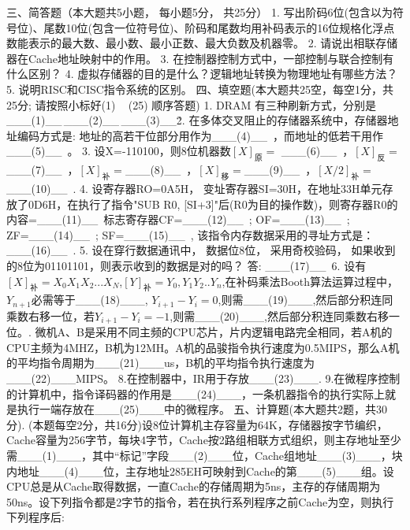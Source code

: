 三、简答题（本大题共5小题， 每小题5分， 共25分）
1. 写出阶码6位(包含以为符号位)、尾数10位(包含一位符号位)、阶码和尾数均用补码表示的16位规格化浮点数能表示的最大数、最小数、最小正数、最大负数及机器零。
2. 请说出相联存储器在Cache地址映射中的作用。
3. 在控制器控制方式中，一部控制与联合控制有什么区别？
4. 虚拟存储器的目的是什么？逻辑地址转换为物理地址有哪些方法？
5. 说明RISC和CISC指令系统的区别。
四、填空题(本大题共25空，每空1分，共25分; 请按照小标好(1) ~ (25) 顺序答题)
1. DRAM 有三种刷新方式，分别是\_\_\_(1)\_\_\,\_\_\_(2)\_\_\,\_\_\_(3)\_\_\.
2. 在多体交叉阻止的存储器系统中，存储器地址编码方式是: 地址的高若干位部分用作为\_\_\_(4)\_\_\ ，而地址的低若干用作\_\_\_(5)\_\_\ 。
3. 设X=-110100，则8位机器数$[X]_{\mbox{原}}=$ \_\_\_(6)\_\_\ ，$[X]_{\mbox{反}}=$\_\_\_(7)\_\_\ ，$[X]_{\mbox{补}}=$\_\_\_(8)\_\_\ ，$[X]_{\mbox{移}}=$\_\_\_(9)\_\_\ ，$[X/2]_{\mbox{补}}=$\_\_\_(10)\_\_\ .
4. 设寄存器RO=0A5H， 变址寄存器SI=30H，在地址33H单元存放了0D6H，在执行了指令"SUB R0, [SI+3]"后(R0为目的操作数)，则寄存器R0的内容=\_\_\_(11)\_\_\, 标志寄存器CF=\_\_\_(12)\_\_\ ; OF=\_\_\_(13)\_\_\ ; ZF=\_\_\_(14)\_\_\ ; SF=\_\_\_(15)\_\_\ , 该指令内存数据采用的寻址方式是：\_\_\_(16)\_\_\ .
5. 设在穿行数据通讯中， 数据位8位， 采用奇校验码， 如果收到的8位为01101101，则表示收到的数据是对的吗？ 答: \_\_\_(17)\_\_\
6. 设有$[X]_{补}=X_0 X_1 X_2...X_N$,$[Y]_{\mbox{补}}=Y_0,Y_1Y_2..Y_n$,在补码乘法Booth算法运算过程中，$Y_{n+1}$必需等于\_\_\_(18)\_\_\_,
$Y_{i+1}-Y_{i}=0$,则需\_\_\_(19)\_\_\_,然后部分积连同乘数右移一位，若$Y_{i+1}-Y_{i}=-1$,则需\_\_\_(20)\_\_\_,然后部分积连同乘数右移一位。\newline
7. 微机A、B是采用不同主频的CPU芯片，片内逻辑电路完全相同，若A机的CPU主频为4MHZ，B机为12MH。A机的品骏指令执行速度为0.5MIPS，那么A机的平均指令周期为\_\_\_(21)\_\_\_us，B机的平均指令执行速度为\_\_\_(22)\_\_\_MIPS。\newline
8.在控制器中，IR用于存放\_\_\_(23)\_\_\_.\newline
9.在微程序控制的计算机中，指令译码器的作用是\_\_\_(24)\_\_\_，一条机器指令的执行实际上就是执行一端存放在\_\_\_(25)\_\_\_中的微程序。
五、计算题(本大题共2题，共30分). (本题每空2分，共16分)设8位计算机主存容量为64K，存储器按字节编织，Cache容量为256字节，每块4字节，Cache按2路组相联方式组织，则主存地址至少需\_\_\_(1)\_\_\_，其中“标记”字段\_\_\_(2)\_\_\_位，Cache组地址\_\_\_(3)\_\_\_，块内地址\_\_\_(4)\_\_\_位，主存地址285EH可映射到Cache的第\_\_\_(5)\_\_\_组。设CPU总是从Cache取得数据，一直Cache的存储周期为5ns，主存的存储周期为50ns。设下列指令都是2字节的指令，若在执行系列程序之前Cache为空，则执行下列程序后:\newline
